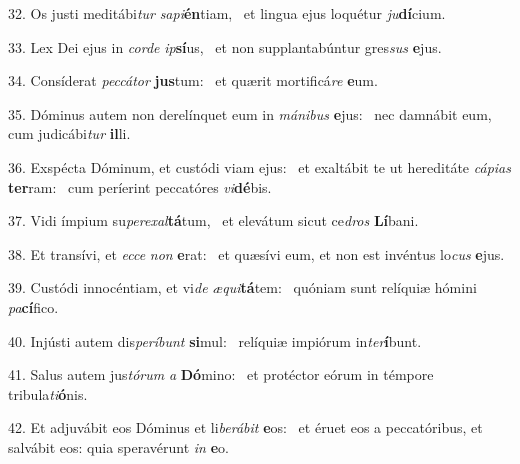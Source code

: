 32. Os justi meditábi\textit{tur} \textit{sa}\textit{pi}\textbf{én}tiam, \ast\  et lingua ejus loquétur \textit{ju}\textbf{dí}cium.\

33. Lex Dei ejus in \textit{cor}\textit{de} \textit{ip}\textbf{sí}us, \ast\  et non supplantabúntur gres\textit{sus} \textbf{e}jus.\

34. Consíderat \textit{pec}\textit{cá}\textit{tor} \textbf{jus}tum: \ast\  et quærit mortificá\textit{re} \textbf{e}um.\

35. Dóminus autem non derelínquet eum in \textit{má}\textit{ni}\textit{bus} \textbf{e}jus: \ast\  nec damnábit eum, cum judicábi\textit{tur} \textbf{il}li.\

36. Exspécta Dóminum, et custódi viam ejus: \dag\  et exaltábit te ut hereditáte \textit{cá}\textit{pi}\textit{as} \textbf{ter}ram: \ast\  cum períerint peccatóres \textit{vi}\textbf{dé}bis.\

37. Vidi ímpium su\textit{per}\textit{ex}\textit{al}\textbf{tá}tum, \ast\  et elevátum sicut ce\textit{dros} \textbf{Lí}bani.\

38. Et transívi, et \textit{ec}\textit{ce} \textit{non} \textbf{e}rat: \ast\  et quæsívi eum, et non est invéntus lo\textit{cus} \textbf{e}jus.\

39. Custódi innocéntiam, et vi\textit{de} \textit{æ}\textit{qui}\textbf{tá}tem: \ast\  quóniam sunt relíquiæ hómini \textit{pa}\textbf{cí}fico.\

40. Injústi autem dis\textit{per}\textit{í}\textit{bunt} \textbf{si}mul: \ast\  relíquiæ impiórum in\textit{ter}\textbf{í}bunt.\

41. Salus autem jus\textit{tó}\textit{rum} \textit{a} \textbf{Dó}mino: \ast\  et protéctor eórum in témpore tribula\textit{ti}\textbf{ó}nis.\

42. Et adjuvábit eos Dóminus et li\textit{be}\textit{rá}\textit{bit} \textbf{e}os: \ast\  et éruet eos a peccatóribus, et salvábit eos: quia speravérunt \textit{in} \textbf{e}o.\

